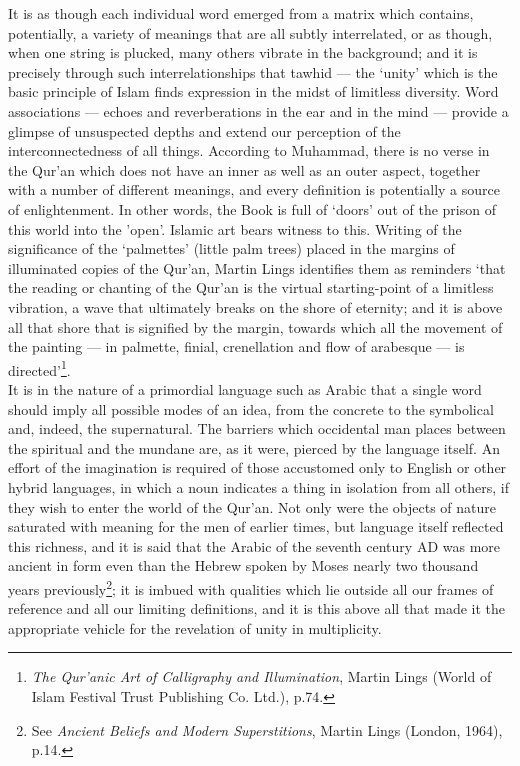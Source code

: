 \documentclass[10pt, twoside,openright]{book}
\begin{document}
It is as though each individual word emerged from a matrix which contains, potentially, a variety of 
meanings that are all subtly interrelated, or as though, when one string is plucked, many others 
vibrate in the background; and it is precisely through such interrelationships that tawhid --- the 
`unity' which is the basic principle of Islam finds expression in the midst of limitless diversity. 
Word associations --- echoes and reverberations in the ear and in the mind --- provide a glimpse of 
unsuspected depths and extend our perception of the interconnectedness of all things. According to 
Muhammad, there is no verse in the Qur'an which does not have an inner as well as an outer aspect, 
together with a number of different meanings, and every definition is potentially a source of 
enlightenment. In other words, the Book is full of `doors' out of the prison of this world into the 
'open'. Islamic art bears witness to this. Writing of the significance of the `palmettes' (little 
palm trees) placed in the margins of illuminated copies of the Qur'an, Martin Lings identifies them 
as reminders `that the reading or chanting of the Qur'an is the virtual starting-point of a limitless 
vibration, a wave that ultimately breaks on the shore of eternity; and it is above all that shore 
that is signified by the margin, towards which all the movement of the painting --- in palmette, 
finial, crenellation and flow of arabesque --- is directed'\footnote{\emph{The Qur'anic Art of Calligraphy and Illumination}, Martin Lings (World of Islam Festival Trust Publishing Co. Ltd.), p.74.}. \\

It is in the nature of a primordial language such as Arabic that a single word should imply all 
possible modes of an idea, from the concrete to the symbolical and, indeed, the supernatural. The 
barriers which occidental man places between the spiritual and the mundane are, as it were, pierced 
by the language itself. An effort of the imagination is required of those accustomed only to English 
or other hybrid languages, in which a noun indicates a thing in isolation from all others, if they 
wish to enter the world of the Qur'an. Not only were the objects of nature saturated with meaning for 
the men of earlier times, but language itself reflected this richness, and it is said that the Arabic 
of the seventh century AD was more ancient in form even than the Hebrew spoken by Moses nearly two 
thousand years previously\footnote{See \emph{Ancient Beliefs and Modern Superstitions}, Martin Lings (London, 1964), p.14.}; it is imbued with qualities which lie outside all our frames of reference and all our limiting definitions, and it is this above all that made it the appropriate vehicle for the revelation of unity in multiplicity. \\
\end{document}
